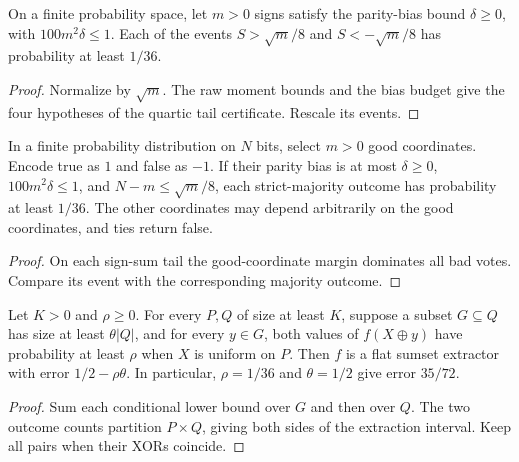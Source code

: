 \begin{theorem}
  \label{thm:lowerbounds-algebraic-parity-tails}
  \leanok
  On a finite probability space, let $m>0$ signs satisfy the parity-bias
  bound $\delta\ge0$, with $100m^2\delta\le1$. Each of the events
  $S>\sqrt m/8$ and $S<-\sqrt m/8$ has probability at least $1/36$.
\end{theorem}
\begin{proof}
  \leanok
  Normalize by $\sqrt m$. The raw moment bounds and the bias budget give
  the four hypotheses of the quartic tail certificate. Rescale its events.
\end{proof}

\begin{theorem}
  \label{thm:lowerbounds-algebraic-majority-probability}
  \leanok
  In a finite probability distribution on $N$ bits, select $m>0$ good
  coordinates. Encode true as $1$ and false as $-1$. If their parity bias
  is at most $\delta\ge0$, $100m^2\delta\le1$, and
  $N-m\le\sqrt m/8$, each strict-majority outcome has probability at
  least $1/36$. The other coordinates may depend arbitrarily on the good
  coordinates, and ties return false.
\end{theorem}
\begin{proof}
  \leanok
  On each sign-sum tail the good-coordinate margin dominates all bad
  votes. Compare its event with the corresponding majority outcome.
\end{proof}

\begin{theorem}
  \label{thm:lowerbounds-algebraic-extractor-conditioning}
  \leanok
  Let $K>0$ and $\rho\ge0$. For every $P,Q$ of size at least $K$,
  suppose a subset $G\subseteq Q$ has size at least $\theta|Q|$, and
  for every $y\in G$, both values of $f(X\oplus y)$ have probability
  at least $\rho$ when $X$ is uniform on $P$. Then $f$ is a flat
  sumset extractor with error $1/2-\rho\theta$. In particular,
  $\rho=1/36$ and $\theta=1/2$ give error $35/72$.
\end{theorem}
\begin{proof}
  \leanok
  Sum each conditional lower bound over $G$ and then over $Q$.
  The two outcome counts partition $P\times Q$, giving both sides
  of the extraction interval. Keep all pairs when their XORs coincide.
\end{proof}

